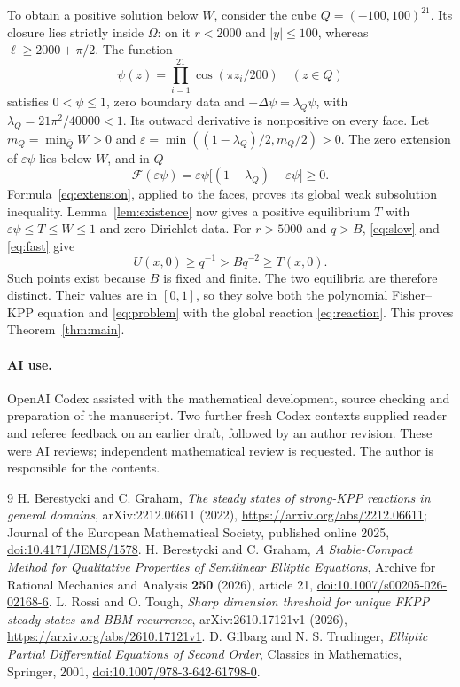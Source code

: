 \documentclass[11pt]{article}
\newcommand{\Om}{\Omega}
\newcommand{\F}{\mathcal F}
\begin{document}
To obtain a positive solution below $W$, consider the cube $Q=(-100,100)^{21}$.
Its closure lies strictly inside $\Om$: on it $r<2000$ and $|y|\leq100$,
whereas $\ell\geq2000+\pi/2$.
The function
\[
 \psi(z)=\prod_{i=1}^{21}\cos(\pi z_i/200)\quad(z\in Q)
\]
satisfies $0<\psi\leq1$, zero boundary data and
$-\Delta\psi=\lambda_Q\psi$, with $\lambda_Q=21\pi^2/40000<1$.
Its outward derivative is nonpositive on every face.
Let $m_Q=\min_{\overline Q}W>0$ and
$\varepsilon=\min((1-\lambda_Q)/2,m_Q/2)>0$.
The zero extension of $\varepsilon\psi$ lies below $W$, and in $Q$
\[
 \F(\varepsilon\psi)=\varepsilon\psi
                   \bigl[(1-\lambda_Q)-\varepsilon\psi\bigr]\geq0.
\]
Formula~\eqref{eq:extension}, applied to the faces, proves its global weak
subsolution inequality. Lemma~\ref{lem:existence} now gives a positive
equilibrium $T$ with $\varepsilon\psi\leq T\leq W\leq1$ and zero Dirichlet data.
For $r>5000$ and $q>B$, \eqref{eq:slow} and \eqref{eq:fast} give
\[
 U(x,0)\geq q^{-1}>Bq^{-2}\geq T(x,0).
\]
Such points exist because $B$ is fixed and finite. The two equilibria are
therefore distinct. Their values are in $[0,1]$, so they solve both the
polynomial Fisher--KPP equation and \eqref{eq:problem} with the global
reaction \eqref{eq:reaction}. This proves Theorem~\ref{thm:main}.

\paragraph{AI use.}
OpenAI Codex assisted with the mathematical development, source checking and
preparation of the manuscript. Two further fresh Codex contexts supplied
reader and referee feedback on an earlier draft, followed by an author
revision. These were AI reviews; independent mathematical review is requested.
The author is responsible for the contents.

\begin{thebibliography}{9}
 H. Berestycki and C. Graham,
\emph{The steady states of strong-KPP reactions in general domains},
arXiv:2212.06611 (2022), \url{https://arxiv.org/abs/2212.06611};
Journal of the European Mathematical Society, published online 2025,
\href{https://doi.org/10.4171/JEMS/1578}{doi:10.4171/JEMS/1578}.
 H. Berestycki and C. Graham,
\emph{A Stable-Compact Method for Qualitative Properties of Semilinear Elliptic Equations},
Archive for Rational Mechanics and Analysis \textbf{250} (2026), article 21,
\href{https://doi.org/10.1007/s00205-026-02168-6}{doi:10.1007/s00205-026-02168-6}.
 L. Rossi and O. Tough,
\emph{Sharp dimension threshold for unique FKPP steady states and BBM recurrence},
arXiv:2610.17121v1 (2026), \url{https://arxiv.org/abs/2610.17121v1}.
 D. Gilbarg and N. S. Trudinger,
\emph{Elliptic Partial Differential Equations of Second Order},
Classics in Mathematics, Springer, 2001,
\href{https://doi.org/10.1007/978-3-642-61798-0}{doi:10.1007/978-3-642-61798-0}.
\end{thebibliography}
\end{document}

